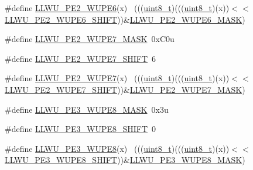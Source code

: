 \begin{DoxyCompactItemize}
\#define \hyperlink{group___l_l_w_u___register___masks_gad35ab3e8d69e872723948df07a8ba2c9}{L\+L\+W\+U\+\_\+\+P\+E2\+\_\+\+W\+U\+P\+E6}(x)                                            ~(((\hyperlink{_p_e___types_8h_aba7bc1797add20fe3efdf37ced1182c5}{uint8\+\_\+t})(((\hyperlink{_p_e___types_8h_aba7bc1797add20fe3efdf37ced1182c5}{uint8\+\_\+t})(x))$<$$<$\hyperlink{group___l_l_w_u___register___masks_gaa7a0191eaf60166333a8bee953239c85}{L\+L\+W\+U\+\_\+\+P\+E2\+\_\+\+W\+U\+P\+E6\+\_\+\+S\+H\+I\+FT}))\&\hyperlink{group___l_l_w_u___register___masks_ga0db50e96153e1ca74874da97d1c22f41}{L\+L\+W\+U\+\_\+\+P\+E2\+\_\+\+W\+U\+P\+E6\+\_\+\+M\+A\+SK})
\item 
\#define \hyperlink{group___l_l_w_u___register___masks_ga39b30f51fdd7f83bb5aa29bf2bc87c26}{L\+L\+W\+U\+\_\+\+P\+E2\+\_\+\+W\+U\+P\+E7\+\_\+\+M\+A\+SK}~0x\+C0u
\item 
\#define \hyperlink{group___l_l_w_u___register___masks_ga82bfb99732d7f90dacdc01ef5222a59a}{L\+L\+W\+U\+\_\+\+P\+E2\+\_\+\+W\+U\+P\+E7\+\_\+\+S\+H\+I\+FT}~6
\item 
\#define \hyperlink{group___l_l_w_u___register___masks_ga8e25a99e51b43f2817a9e5da0e62e3bd}{L\+L\+W\+U\+\_\+\+P\+E2\+\_\+\+W\+U\+P\+E7}(x)                                            ~(((\hyperlink{_p_e___types_8h_aba7bc1797add20fe3efdf37ced1182c5}{uint8\+\_\+t})(((\hyperlink{_p_e___types_8h_aba7bc1797add20fe3efdf37ced1182c5}{uint8\+\_\+t})(x))$<$$<$\hyperlink{group___l_l_w_u___register___masks_ga82bfb99732d7f90dacdc01ef5222a59a}{L\+L\+W\+U\+\_\+\+P\+E2\+\_\+\+W\+U\+P\+E7\+\_\+\+S\+H\+I\+FT}))\&\hyperlink{group___l_l_w_u___register___masks_ga39b30f51fdd7f83bb5aa29bf2bc87c26}{L\+L\+W\+U\+\_\+\+P\+E2\+\_\+\+W\+U\+P\+E7\+\_\+\+M\+A\+SK})
\item 
\#define \hyperlink{group___l_l_w_u___register___masks_gabe7fce492e2c0201c4bb5af893f5a63d}{L\+L\+W\+U\+\_\+\+P\+E3\+\_\+\+W\+U\+P\+E8\+\_\+\+M\+A\+SK}~0x3u
\item 
\#define \hyperlink{group___l_l_w_u___register___masks_gaf02591badd7f37915120d0fd627cdf27}{L\+L\+W\+U\+\_\+\+P\+E3\+\_\+\+W\+U\+P\+E8\+\_\+\+S\+H\+I\+FT}~0
\item 
\#define \hyperlink{group___l_l_w_u___register___masks_ga61f1881833fb1eecf76dca9958fe19b2}{L\+L\+W\+U\+\_\+\+P\+E3\+\_\+\+W\+U\+P\+E8}(x)                                            ~(((\hyperlink{_p_e___types_8h_aba7bc1797add20fe3efdf37ced1182c5}{uint8\+\_\+t})(((\hyperlink{_p_e___types_8h_aba7bc1797add20fe3efdf37ced1182c5}{uint8\+\_\+t})(x))$<$$<$\hyperlink{group___l_l_w_u___register___masks_gaf02591badd7f37915120d0fd627cdf27}{L\+L\+W\+U\+\_\+\+P\+E3\+\_\+\+W\+U\+P\+E8\+\_\+\+S\+H\+I\+FT}))\&\hyperlink{group___l_l_w_u___register___masks_gabe7fce492e2c0201c4bb5af893f5a63d}{L\+L\+W\+U\+\_\+\+P\+E3\+\_\+\+W\+U\+P\+E8\+\_\+\+M\+A\+SK})
$$
\end{DoxyCompactItemize}

